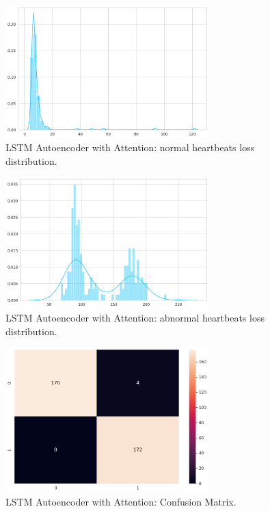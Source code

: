 \documentclass{article}
\begin{document}
\begin{figure}[!t]
    \centering
    \includegraphics[width=0.7\textwidth]{images/attention_normal.png}
    \caption{LSTM Autoencoder with Attention: normal heartbeats loss distribution.}
\end{figure}
\begin{figure}[!t]
    \centering
    \includegraphics[width=0.7\textwidth]{images/attention_abnormal.png}
    \caption{LSTM Autoencoder with Attention: abnormal heartbeats loss distribution.}
\end{figure}
\begin{figure}[!t]
    \centering
    \includegraphics[width=0.7\textwidth]{images/attention_Cofmat.png}
    \caption{LSTM Autoencoder with Attention: Confusion Matrix.}
\end{figure}
\end{document}
